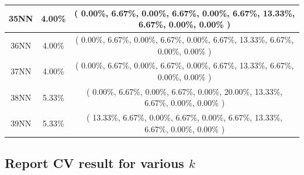 \documentclass[11pt,a4paper]{article}
\begin{document}
\begin{center}
\begin{tabular} {|| c | c | c ||}
35NN & 4.00\% & ( 0.00\%, 6.67\%, 0.00\%, 6.67\%, 0.00\%, 6.67\%, 13.33\%, 6.67\%, 0.00\%, 0.00\% ) \\ \hline
36NN & 4.00\% & ( 0.00\%, 6.67\%, 0.00\%, 6.67\%, 0.00\%, 6.67\%, 13.33\%, 6.67\%, 0.00\%, 0.00\% ) \\ \hline
37NN & 4.00\% & ( 0.00\%, 6.67\%, 0.00\%, 6.67\%, 0.00\%, 6.67\%, 13.33\%, 6.67\%, 0.00\%, 0.00\% ) \\ \hline
38NN & 5.33\% & ( 0.00\%, 6.67\%, 0.00\%, 6.67\%, 0.00\%, 20.00\%, 13.33\%, 6.67\%, 0.00\%, 0.00\% ) \\ \hline
39NN & 5.33\% & ( 13.33\%, 6.67\%, 0.00\%, 6.67\%, 0.00\%, 6.67\%, 13.33\%, 6.67\%, 0.00\%, 0.00\% ) \\ \hline
    \end{tabular}
\end{center}
\newpage

\subsection{Report CV result for various $k$}
\hypertarget{kResultUNSCALED}{}
\end{document}
